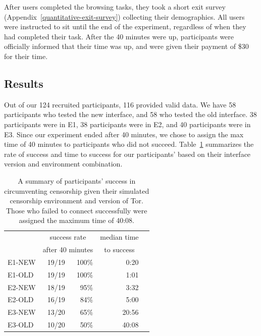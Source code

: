 \documentclass[USenglish,oneside,twocolumn]{article}
\begin{document}
After users completed the browsing tasks, they took a short exit survey (Appendix~\ref{quantitative-exit-survey})
collecting their demographics. All users were instructed to sit until the end of the experiment,
regardless of when they had completed their task. After the 40 minutes were up, 
participants were officially informed that their time was up, and were given their payment of 
\$30 for their time. 

\subsection{Results} 
Out of our 124 recruited participants, 116 provided valid data. We have 58 participants who tested the new interface, and 58 who tested the old interface. 38 participants were in E1, 38 participants were in E2, and 40 participants were in E3. Since our experiment ended after 40 minutes, we chose to assign the max time of 40 minutes to participants who did not succeed. Table~\ref{table:participant-summary} summarizes the rate of success and time to success for our participants' based on their interface version and environment combination. 

\begin{table}
\centering
	\begin{tabular}{l r r r r}
	& \multicolumn{2}{c}{success rate} & \multicolumn{1}{c}{median time} \\
	& \multicolumn{2}{c}{after 40 minutes} & \multicolumn{1}{c}{to success} \\
	\noalign{\hrule}
	E1-NEW & 19/19 & 100\% & 0:20 \\ %
	E1-OLD & 19/19 & 100\% & 1:01 \\ %
	E2-NEW & 18/19 & 95\% & 3:32 \\ %
	E2-OLD & 16/19 & 84\% & 5:00 \\ %
	E3-NEW & 13/20 & 65\% & 20:56 \\ %
	E3-OLD & 10/20 & 50\% & 40:08 \\ %
	\end{tabular}
\caption{
A summary of participants' success in circumventing censorship
given their simulated censorship environment and version of Tor. Those who
failed to connect successfully were assigned the maximum time of 40:08.
}
\label{table:participant-summary}
\end{table}
\end{document}
